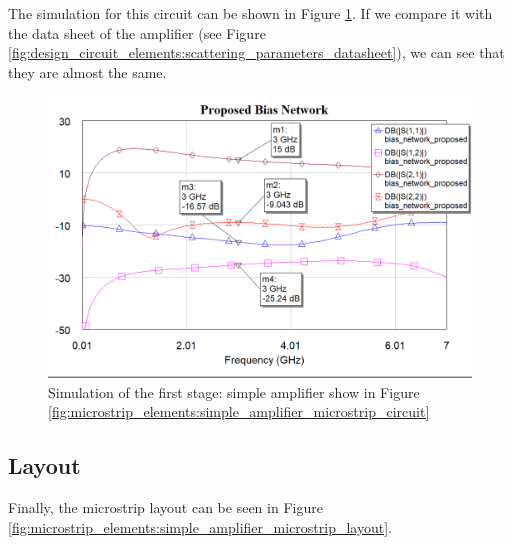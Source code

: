 \documentclass[12pt]{report} %
\begin{document}
The simulation for this circuit can be shown in Figure \ref{fig:microstrip_elements:simple_amplifier_microstrip_graph}. If we compare it with the data sheet of the amplifier (see Figure \ref{fig:design_circuit_elements:scattering_parameters_datasheet}), we can see that they are almost the same.

\begin{figure}[htbp]
    \centering
    \includegraphics[width=1\linewidth]{images//microstrip_elements/simple_amplifier_microstrip_graph.png}
    \caption{Simulation of the first stage: simple amplifier show in Figure \ref{fig:microstrip_elements:simple_amplifier_microstrip_circuit}}
    \label{fig:microstrip_elements:simple_amplifier_microstrip_graph}
\end{figure}

\subsection{Layout}

Finally, the microstrip layout can be seen in Figure \ref{fig:microstrip_elements:simple_amplifier_microstrip_layout}.
\end{document}
